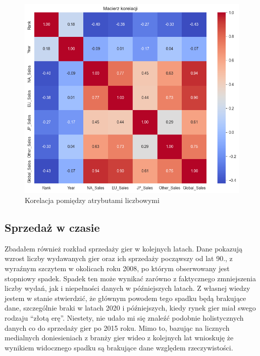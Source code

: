 \documentclass[11pt]{article}
\begin{document}
\begin{figure}[H]
    \centering
    \includegraphics{figures/korelacje}
    \caption{Korelacja pomiędzy atrybutami liczbowymi}
    \label{fig:korelacje}
\end{figure}

\subsection{Sprzedaż w czasie}\label{subsec:sprzedaz-w-czasie}

Zbadałem również rozkład sprzedaży gier w kolejnych latach.
Dane pokazują wzrost liczby wydawanych gier oraz ich sprzedaży począwszy od lat 90.,
z wyraźnym szczytem w okolicach roku 2008, po którym obserwowany jest stopniowy spadek.
Spadek ten może wynikać zarówno z faktycznego zmniejszenia liczby wydań, jak i niepełności danych w późniejszych latach.
Z własnej wiedzy jestem w stanie stwierdzić, że głównym powodem tego spadku będą brakujące dane,
szczególnie braki w latach 2020 i późniejszych, kiedy rynek gier miał swego rodzaju ``złotą erę''.
Niestety, nie udało mi się znaleźć podobnie holistycznych danych co do sprzedaży gier po 2015 roku.
Mimo to, bazując na licznych medialnych doniesieniach z branży gier wideo z kolejnych lat wnioskuję że wynikiem widocznego spadku są brakujące dane względem rzeczywistości.
\end{document}

